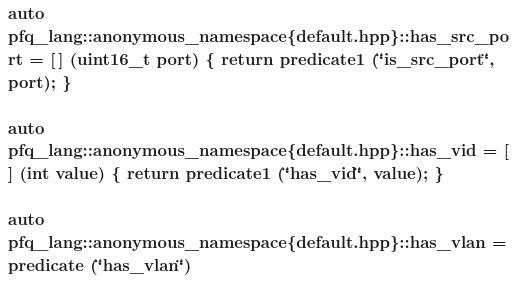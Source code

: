 \hypertarget{namespacepfq__lang_1_1anonymous__namespace_02default_8hpp_03_ad6d8ed8e08a448b3bf5d23a929d887f9}{
\subsubsection[{has\-\_\-src\-\_\-port}]{\setlength{\rightskip}{0pt plus 5cm}auto pfq\-\_\-lang\-::anonymous\-\_\-namespace\{default.\-hpp\}\-::has\-\_\-src\-\_\-port = \mbox{[}$\,$\mbox{]} (uint16\-\_\-t {\bf port}) \{ return {\bf predicate1} (\char`\"{}is\-\_\-src\-\_\-port\char`\"{}, port); \}}}\label{namespacepfq__lang_1_1anonymous__namespace_02default_8hpp_03_ad6d8ed8e08a448b3bf5d23a929d887f9}
\hypertarget{namespacepfq__lang_1_1anonymous__namespace_02default_8hpp_03_adddd2dea56164719f2853af158911a80}{
\subsubsection[{has\-\_\-vid}]{\setlength{\rightskip}{0pt plus 5cm}auto pfq\-\_\-lang\-::anonymous\-\_\-namespace\{default.\-hpp\}\-::has\-\_\-vid = \mbox{[}$\,$\mbox{]} (int value) \{ return {\bf predicate1} (\char`\"{}has\-\_\-vid\char`\"{}, value); \}}}\label{namespacepfq__lang_1_1anonymous__namespace_02default_8hpp_03_adddd2dea56164719f2853af158911a80}
\hypertarget{namespacepfq__lang_1_1anonymous__namespace_02default_8hpp_03_a30a0c8d9bcd28cd17c6c1699c3339c3f}{
\subsubsection[{has\-\_\-vlan}]{\setlength{\rightskip}{0pt plus 5cm}auto pfq\-\_\-lang\-::anonymous\-\_\-namespace\{default.\-hpp\}\-::has\-\_\-vlan = {\bf predicate} (\char`\"{}has\-\_\-vlan\char`\"{})}}\label{namespacepfq__lang_1_1anonymous__namespace_02default_8hpp_03_a30a0c8d9bcd28cd17c6c1699c3339c3f}
